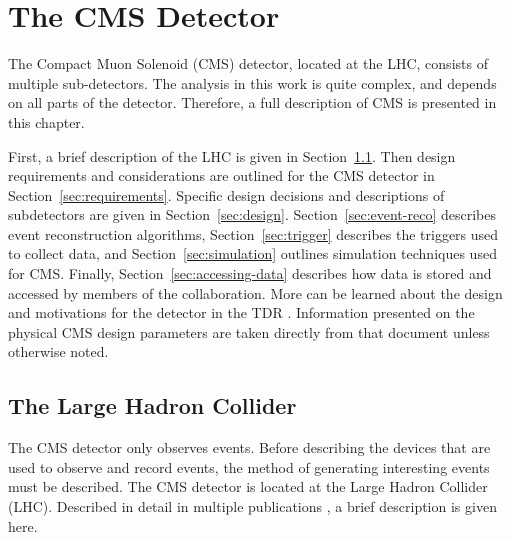 \chapter{The CMS Detector} \label{ch:detector}

The Compact Muon Solenoid (CMS) detector, located at the LHC,
consists of multiple sub-detectors.
The analysis in this work is quite complex,
and depends on all parts of the detector.
Therefore, a full description of CMS is presented in this chapter.

First, a brief description of the LHC is given in Section~\ref{sec:lhc}.
Then design requirements and considerations are outlined for the CMS detector
in Section~\ref{sec:requirements}.
Specific design decisions and descriptions of subdetectors are given
in Section~\ref{sec:design}.
Section~\ref{sec:event-reco} describes event reconstruction algorithms,
Section~\ref{sec:trigger} describes the triggers used to collect data,
and Section~\ref{sec:simulation} outlines simulation techniques used for CMS.
Finally, Section~\ref{sec:accessing-data} describes how data is stored and accessed
by members of the collaboration.
More can be learned about the design and motivations for the detector
in the TDR \cite{cms-tdr}.
Information presented on the physical CMS design parameters are
taken directly from that document unless otherwise noted.

\section{The Large Hadron Collider} \label{sec:lhc}

The CMS detector only observes events.
Before describing the devices that are used to observe and record events,
the method of generating interesting events must be described.
The CMS detector is located at the Large Hadron Collider (LHC).
Described in detail in multiple publications \cite{Evans_2008},
a brief description is given here.

